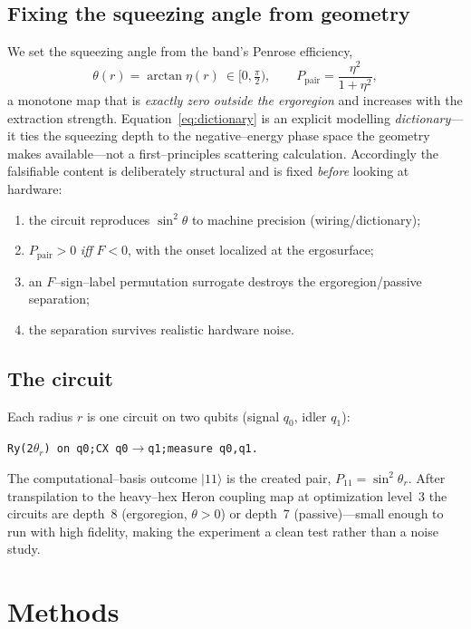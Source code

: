 \documentclass[11pt]{article}
\newcommand{\Ppair}{P_{\mathrm{pair}}}
\newcommand{\code}[1]{\texttt{\small #1}}
\begin{document}
\subsection{Fixing the squeezing angle from geometry}
We set the squeezing angle from the band's Penrose efficiency,
\begin{equation}
\theta(r)=\arctan\eta(r)\ \in[0,\tfrac{\pi}{2}),\qquad
\Ppair=\frac{\eta^2}{1+\eta^2},
\label{eq:dictionary}
\end{equation}
a monotone map that is \emph{exactly zero outside the ergoregion} and increases with the
extraction strength. Equation~\eqref{eq:dictionary} is an explicit modelling
\emph{dictionary}---it ties the squeezing depth to the negative--energy phase space the geometry
makes available---not a first--principles scattering calculation. Accordingly the falsifiable
content is deliberately structural and is fixed \emph{before} looking at hardware:
\begin{enumerate}[nosep,label=(G\arabic*)]
\item the circuit reproduces $\sin^2\theta$ to machine precision (wiring/dictionary);
\item $\Ppair>0$ \emph{iff} $F<0$, with the onset localized at the ergosurface;
\item an $F$--sign--label permutation surrogate destroys the ergoregion/passive separation;
\item the separation survives realistic hardware noise.
\end{enumerate}

\subsection{The circuit}
Each radius $r$ is one circuit on two qubits (signal $q_0$, idler $q_1$):
\begin{center}
\code{Ry(2$\theta_r$) on q0;\quad CX q0$\to$q1;\quad measure q0,q1.}
\end{center}
The computational--basis outcome $\lvert11\rangle$ is the created pair, $P_{11}=\sin^2\theta_r$.
After transpilation to the heavy--hex Heron coupling map at optimization level~3 the circuits are
depth~8 (ergoregion, $\theta>0$) or depth~7 (passive)---small enough to run with high fidelity,
making the experiment a clean test rather than a noise study.

\section{Methods}
\end{document}
